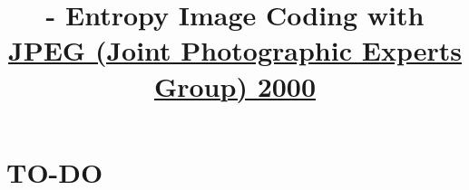 

\title{\SM{} - Entropy Image Coding with \href{https://en.wikipedia.org/wiki/JPEG_2000}{JPEG (Joint Photographic Experts Group) 2000}}

\maketitle
\tableofcontents

\section{TO-DO}
